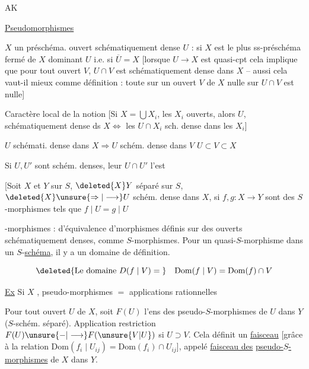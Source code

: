 AK

\uline{Pseudomorphismes}

$X$ un préschéma. ouvert schématiquement dense $U$ : si $X$ est le plus  ss-préschéma fermé de $X$ dominant $U$ i.e. si $\overline U=X$ [lorsque $U\longrightarrow X$ est quasi-cpt cela implique que pour tout ouvert $V$, $U\cap V$ est schématiquement dense dans $X$ -- aussi cela vaut-il mieux comme définition : toute  sur un ouvert $V$ de $X$ nulle sur $U\cap V$ est nulle]


 Caractère local de la notion [Si $X=\bigcup X_i$, les $X_i$ ouverts, alors $U$, schématiquement dense ds $X\Longleftrightarrow$ les $U\cap X_i$ sch. dense dans les $X_i$]

$U$ schémati. dense dans $X\Rightarrow U$ schém. dense dans  $V$  $U\subset V\subset X$

Si $U,U'$ sont schém. denses, leur $U\cap U'$ l'est

[Soit $X$ et $Y$ sur $S$, $\deleted{X}Y$ séparé sur $S$, $\deleted{X}\unsure{\Rightarrow|\longrightarrow}U$ schém. dense dans $X$, si $f,g:X\longrightarrow Y$ sont des $S$-morphismes tels que $f\mid U=g\mid U$

-morphismes :  d'équivalence d'morphismes définis sur des ouverts schématiquement denses, comme $S$-morphismes. Pour un quasi-$S$-morphisme dans un $S$-\uline{schéma}, il y a un  domaine de définition.

\[
\deleted{\text{Le domaine }D(f\mid V)={}}\quad
\mathrm{Dom}(f\mid V)=\mathrm{Dom}(f)\cap V
\]



\uline{Ex} Si $X$  , pseudo-morphismes $=$ applications rationnelles

Pour tout ouvert $U$ de $X$, soit $F(U)$ l'ens des pseudo-$S$-morphismes de $U$ dans $Y$ ($S$-schém. séparé). Application restriction $F(U)\unsure{\mathord{-}|\longrightarrow}F(\unsure{V|U})$ si $U\supset V$. Cela  définit un \uline{faisceau} [grâce à la relation $\mathrm{Dom}(f_i\mid U_{ij})=\mathrm{Dom}(f_i)\cap U_{ij}$], appelé \uline{faisceau des}  \uline{pseudo-$S$-morphismes} de $X$ dans $Y$.

